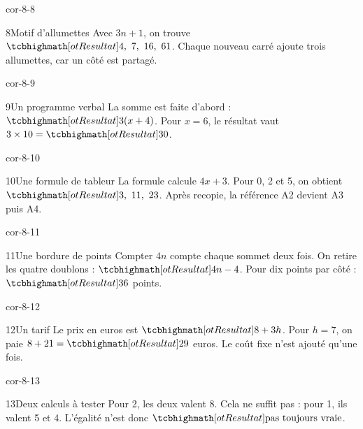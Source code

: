 \begin{blocLivre}{cor-8-8}\begin{corrige}{8}{Motif d’allumettes}
Avec $3n+1$, on trouve $\res{4,\ 7,\ 16,\ 61}$. Chaque nouveau carré ajoute trois allumettes, car un côté est partagé.
\label{fig-cor-8-8}
\end{corrige}\end{blocLivre}
\begin{blocLivre}{cor-8-9}\begin{corrige}{9}{Un programme verbal}
La somme est faite d’abord : $\res{3(x+4)}$. Pour $x=6$, le résultat vaut $3\times10=\res{30}$.
\end{corrige}\end{blocLivre}
\begin{blocLivre}{cor-8-10}\begin{corrige}{10}{Une formule de tableur}
La formule calcule $4x+3$. Pour 0, 2 et 5, on obtient $\res{3,\ 11,\ 23}$. Après recopie, la référence A2 devient A3 puis A4.
\end{corrige}\end{blocLivre}
\begin{blocLivre}{cor-8-11}\begin{corrige}{11}{Une bordure de points}
Compter $4n$ compte chaque sommet deux fois. On retire les quatre doublons : $\res{4n-4}$. Pour dix points par côté : $\res{36}$ points.
\label{fig-cor-8-11}
\end{corrige}\end{blocLivre}
\begin{blocLivre}{cor-8-12}\begin{corrige}{12}{Un tarif}
Le prix en euros est $\res{8+3h}$. Pour $h=7$, on paie $8+21=\res{29}$ euros. Le coût fixe n’est ajouté qu’une fois.
\end{corrige}\end{blocLivre}
\begin{blocLivre}{cor-8-13}\begin{corrige}{13}{Deux calculs à tester}
Pour 2, les deux valent 8. Cela ne suffit pas : pour 1, ils valent 5 et 4. L’égalité n’est donc $\res{\text{pas toujours vraie}}$.
\end{corrige}\end{blocLivre}

